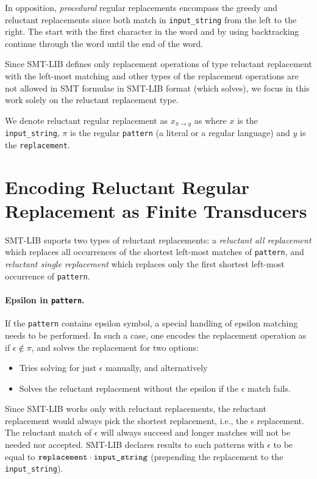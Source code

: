 In opposition, \emph{procedural} regular replacements encompass the greedy and reluctant replacements since both match in \texttt{input\_string} from the left to the right.
The start with the first character in the word and by using backtracking continue through the word until the end of the word.

Since SMT-LIB defines only replacement operations of type reluctant replacement with the left-most matching and other types of the replacement operations are not allowed in SMT formulae in SMT-LIB format (which \noodler solves), we focus in this work solely on the reluctant replacement type.

We denote reluctant regular replacement as $x_{\pi \rightarrow y}$ as where $x$ is the \texttt{input\_string}, $\pi$ is the regular \texttt{pattern} (a literal or a regular language) and $y$ is the \texttt{replacement}.

\section{Encoding Reluctant Regular Replacement as Finite Transducers}

SMT-LIB suports two types of reluctant replacements: a \emph{reluctant all replacement} which replaces all occurrences of the shortest left-most matches of \texttt{pattern}, and \emph{reluctant single replacement} which replaces only the first shortest left-most occurrence of \texttt{pattern}.

\paragraph{Epsilon in \texttt{pattern}.}
If the \texttt{pattern} contains epsilon symbol, a special handling of epsilon matching needs to be performed. In such a case, one encodes the replacement operation as if $\epsilon \notin \pi$, and solves the replacement for two options:
\begin{itemize}
  \item Tries solving for just $\epsilon$ manually, and alternatively
  \item Solves the reluctant replacement without the epsilon if the $\epsilon$ match fails.
\end{itemize}
Since SMT-LIB works only with reluctant replacements, the reluctant replacement would always pick the shortest replacement, i.e., the $\epsilon$ replacement. The reluctant match of $\epsilon$ will always succeed and longer matches will not be needed nor accepted. SMT-LIB declares results to such patterns with $\epsilon$ to be equal to $\texttt{replacement} \cdot \texttt{input\_string}$ (prepending the replacement to the \texttt{input\_string}).


